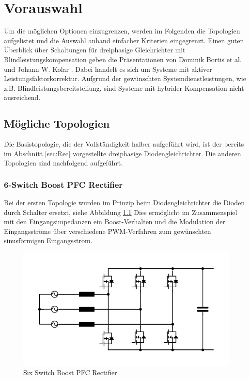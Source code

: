 \chapter{Vorauswahl}
Um die möglichen Optionen einzugrenzen, werden im Folgenden die Topologien aufgelistet und die Auswahl anhand einfacher Kriterien eingegrenzt. Einen guten Überblick über Schaltungen für dreiphasige Gleichrichter mit Blindleistungskompensation geben die Präsentationen von Dominik Bortis et al. \cite{Advanced3PhPFC} und Johann W. Kolar \cite{Essenceof3pKolar}. Dabei handelt es sich um Systeme mit aktiver Leistungsfaktorkorrektur. Aufgrund der gewünschten Systemdienstleistungen, wie z.B. Blindleistungsbereitstellung, sind Systeme mit hybrider Kompensation nicht ausreichend.

\section{Mögliche Topologien}
Die Basistopologie, die der Vollständigkeit halber aufgeführt wird, ist der bereits im Abschnitt \ref{sec:Rec} vorgestellte dreiphasige Diodengleichrichter. Die anderen Topologien sind nachfolgend aufgeführt.
	\subsection{6-Switch Boost PFC Rectifier}
				Bei der ersten Topologie wurden im Prinzip beim Diodengleichrichter die Dioden durch Schalter ersetzt, siehe Abbildung \ref{fig:sixswitchboost} Dies ermöglicht im Zusammenspiel mit den Eingangsimpedanzen ein Boost-Verhalten und die Modulation der Eingangsströme über verschiedene \gls{PWM}-Verfahren zum gewünschten sinusförmigen Eingangsstrom.
			\begin{figure} [H]
				\centering
				\includegraphics[width=0.9\linewidth]{content/Grafiken/SixSwitchBoost}
				\caption{Six Switch Boost PFC Rectifier}
				\label{fig:sixswitchboost}
			\end{figure}
			

